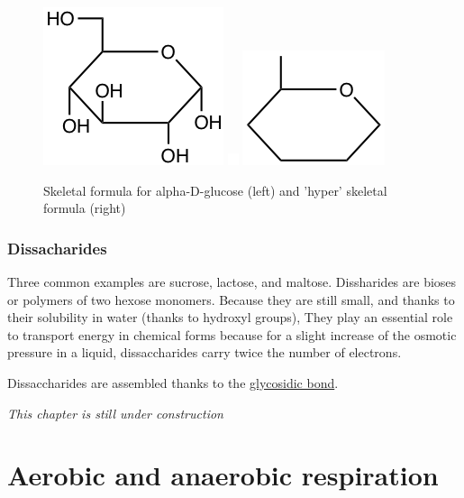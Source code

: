 \documentclass[]{book}
\theoremstyle{definition}
\theoremstyle{definition}
\theoremstyle{definition}
\theoremstyle{remark}
\begin{document}
\begin{figure}

{\centering \includegraphics[width=0.25\linewidth]{pictures/glucose-skeletal} \includegraphics[width=0.25\linewidth]{pictures/blank} \includegraphics[width=0.25\linewidth]{pictures/glucose-hyperskeletal} 

}

\caption{Skeletal formula for alpha-D-glucose (left) and 'hyper' skeletal formula (right)}\label{fig:glucose-skeletal}
\end{figure}

\subsection{Dissacharides}\label{dissacharides}

Three common examples are sucrose, lactose, and maltose. Dissharides are
bioses or polymers of two hexose monomers. Because they are still small,
and thanks to their solubility in water (thanks to hydroxyl groups),
They play an essential role to transport energy in chemical forms
because for a slight increase of the osmotic pressure in a liquid,
dissaccharides carry twice the number of electrons.

Dissaccharides are assembled thanks to the
\protect\hyperlink{glycosidic-bond}{glycosidic bond}.

\emph{This chapter is still under construction}

\hypertarget{aerobic-and-anaerobic-respiration}{\chapter{Aerobic and
anaerobic respiration}\label{aerobic-and-anaerobic-respiration}}
\end{document}
